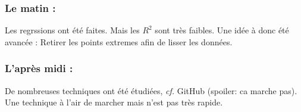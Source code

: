\subsubsection*{Le matin :}
Les regrssions ont été faites.
Mais les $R^2$ sont très faibles.
Une idée à donc été avancée :
Retirer les points extremes afin de lisser les données.

\subsubsection*{L'après midi :}
De nombreuses techniques ont été étudiées, \textit{cf.} GitHub (spoiler: ca marche pas).\\

Une technique à l'air de marcher mais n'est pas très rapide.
